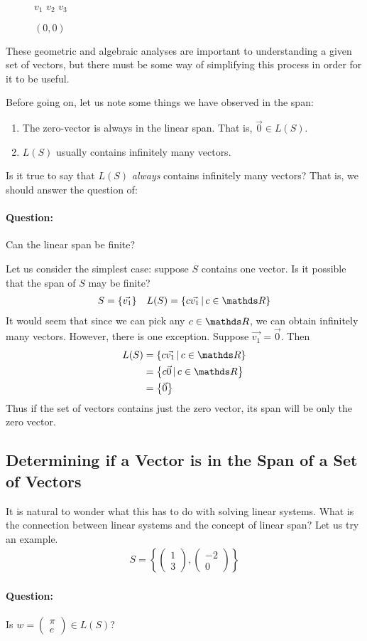 \documentclass[11pt]{article}
\newcommand{\ques}{\paragraph{Question:}}
\begin{document}
\begin{figure}[H]
\centering

{$v_1$}
{$v_2$}
{$v_3$}

$(0,0)$
\end{figure}

\vspace{1cm}

These geometric and algebraic analyses are important to understanding a given set of vectors, but there must be some way of simplifying this process in order for it to be useful.

Before going on, let us note some things we have observed in the span:
\begin{enumerate}
\item{
The zero-vector is always in the linear span. That is, $\vec{0} \in L(S)$.
}
\item{
$L(S)$ usually contains infinitely many vectors.
}
\end{enumerate}

Is it true to say that $L(S)$ \emph{always} contains infinitely many vectors? That is, we should answer the question of:

\ques Can the linear span be finite?

Let us consider the simplest case: suppose $S$ contains one vector. Is it possible that the span of $S$ may be finite?
\begin{align*}
S = \left\{ \vec{v_1} \right\}
&&
L(S) = \left\{ c \vec{v_1} \,|\, c \in \bbR \right\}
\end{align*}
It would seem that since we can pick any $c \in \bbR$, we can obtain infinitely many vectors. However, there is one exception. Suppose $\vec{v_1} = \vec{0}$. Then
\begin{align*}
L(S) &= \left\{ c \vec{v_1} \,|\, c \in \bbR \right\}
\\
&= \left\{ c \vec{0} \,|\, c \in \bbR \right\}
\\
&= \left\{ \vec{0} \right\}
\end{align*}
Thus if the set of vectors contains just the zero vector, its span will be only the zero vector.


\subsection*{Determining if a Vector is in the Span of a Set of Vectors}

It is natural to wonder what this has to do with solving linear systems. What is the connection between linear systems and the concept of linear span? Let us try an example.
\begin{align*}
S = \left\{ \begin{pmatrix}1\\3\end{pmatrix}, \begin{pmatrix}-2\\0\end{pmatrix} \right\}
\end{align*}
\ques Is $w = \begin{pmatrix}\pi \\ e\end{pmatrix} \in L(S)$?
\end{document}
